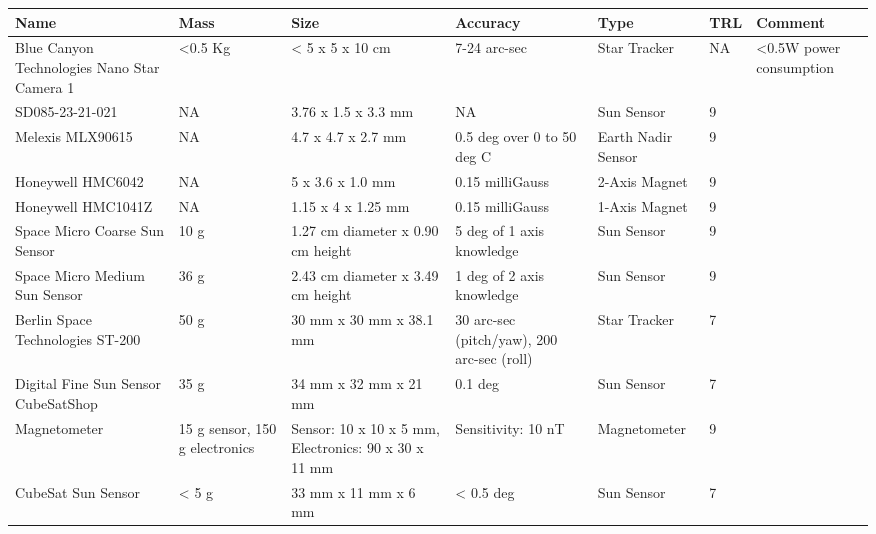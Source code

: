\begin{center}
     \begin{tabular}{ | p{2.25cm} | p{1.25cm} | p{2cm} | p{4cm} | l | l | p{1.75cm} |}
     \hline

      {\bf Name} & {\bf Mass} & {\bf Size} & {\bf Accuracy} & {\bf Type} & {\bf TRL} & {\bf Comment}  \\ \hline

     Blue Canyon Technologies Nano Star Camera 1 \cite{BCT} & <0.5 Kg& < 5 x 5 x 10 cm & 7-24 arc-sec & Star Tracker & NA & <0.5W power consumption \\ \hline

     SD085-23-21-021 \cite{aes2} & NA & 3.76 x 1.5 x 3.3 mm & NA & Sun Sensor & 9 & \\ \hline

     Melexis MLX90615 \cite{aes3} & NA & 4.7 x 4.7 x 2.7 mm& 0.5 deg over 0 to 50 deg C & Earth Nadir Sensor & 9 &  \\
     \hline

     Honeywell HMC6042 \cite{aes4} & NA & 5 x 3.6 x 1.0 mm & 0.15 milliGauss & 2-Axis Magnet & 9 &   \\ \hline

     Honeywell HMC1041Z \cite{aes5} & NA &1.15 x 4 x 1.25 mm & 0.15 milliGauss & 1-Axis Magnet & 9 &   \\ \hline
     
     Space Micro Coarse Sun Sensor \cite{SMI} &  10 g & 1.27 cm diameter x 0.90 cm height & 5 deg of 1 axis knowledge & Sun Sensor & 9 & \\ \hline
     
     Space Micro Medium Sun Sensor \cite{SMI} & 36 g &	2.43 cm diameter x 3.49 cm height & 1 deg of 2 axis knowledge & Sun Sensor & 9 & \\ \hline
     
	Berlin Space Technologies ST-200 \cite{BST} & 50 g & 30 mm x 30 mm x 38.1 mm & 30 arc-sec (pitch/yaw), 200 arc-sec (roll) & Star Tracker & 7 & \\ \hline

	Digital Fine Sun Sensor CubeSatShop \cite{CubeShop} & 35 g & 34 mm x 32 mm x 21 mm & 0.1 deg & Sun Sensor & 7 & \\ \hline
	
	Magnetometer \cite{CubeShop} & 15 g sensor, 150 g electronics & Sensor: 10 x 10 x 5 mm, Electronics: 90 x 30 x 11 mm & Sensitivity: 10 nT & Magnetometer & 9 & \\ \hline
	
	CubeSat Sun Sensor \cite{CubeShop} & < 5 g & 33 mm x 11 mm x 6 mm & < 0.5 deg & Sun Sensor & 7 & \\ \hline

     \end{tabular}
\end{center}


